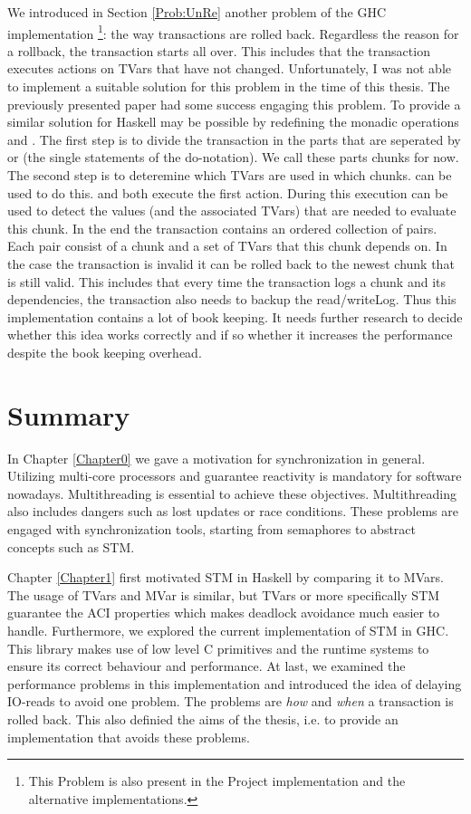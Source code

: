 We introduced in Section \ref{Prob:UnRe} another problem of the GHC implementation \footnote{This 
Problem is also present in the Project implementation and the alternative implementations.}: the way 
transactions are rolled back. Regardless the reason for a rollback, the transaction starts all
over. This includes that the transaction executes actions on TVars that have not changed. Unfortunately,
I was not able to implement a suitable solution for this problem in the time of this thesis. The previously
presented paper \parencite{checkpoint} had some success engaging this problem. To provide a similar 
solution for Haskell may be possible by redefining the monadic operations \code{>>} and \code{>>=}. 
The first step is to divide the transaction in the parts that are seperated by \code{>>} or \code{>>=} 
(the single statements of the do-notation). We call these parts chunks for now. The second step 
is to deteremine which TVars are used in which chunks.  can be used to do this. 
\code{>>} and \code{>>=} both execute the first action. During this execution  can
be used to detect the values (and the associated TVars) that are needed to evaluate this chunk. In the
end the transaction contains an ordered collection of pairs. Each pair consist of a chunk and a set of
TVars that this chunk depends on. In the case the transaction is invalid it can be rolled back to the 
newest chunk that is still valid. This includes that every time the transaction logs a chunk and its 
dependencies, the transaction also needs to backup the read/writeLog. Thus this implementation contains
a lot of book keeping. It needs further research to decide whether this idea works correctly and if so
whether it increases the performance despite the book keeping overhead.

\section{Summary}
In Chapter \ref{Chapter0} we gave a motivation for synchronization in general. Utilizing multi-core
processors and guarantee reactivity is mandatory for software nowadays. Multithreading is essential 
to achieve these objectives. Multithreading also includes dangers such as lost updates or race conditions. 
These problems are engaged with synchronization tools, starting from semaphores to abstract concepts
such as STM.

Chapter \ref{Chapter1} first motivated STM in Haskell by comparing it to MVars. The usage of TVars 
and MVar is similar, but TVars or more specifically STM guarantee the ACI properties which makes
deadlock avoidance much easier to handle. Furthermore, we explored the current implementation of STM
in GHC. This library makes use of low level C primitives and the runtime systems to ensure its 
correct behaviour and performance. At last, we examined the performance problems in this implementation
and introduced the idea of delaying IO-reads to avoid one problem. The problems are \textit{how} and 
\textit{when} a transaction is rolled back. This also definied the aims of the thesis, i.e. 
to provide an implementation that avoids these problems. 

